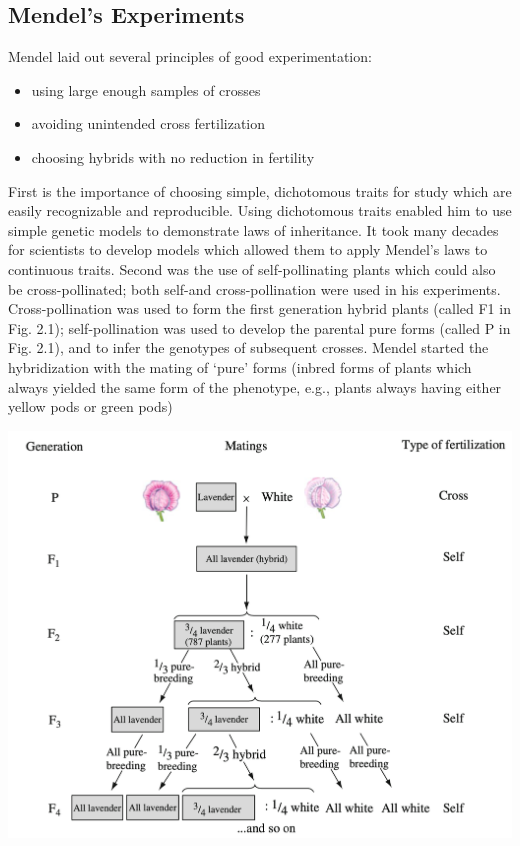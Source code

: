 \documentclass[a4paper,twoside,11pt]{article}
\begin{document}
\subsection{Mendel’s Experiments}
Mendel laid out several principles of good experimentation:
\begin{itemize}
    \item using large enough samples of crosses
    \item avoiding unintended cross fertilization
    \item choosing hybrids with no reduction in fertility
\end{itemize}
\textcolor{NavyBlue}{First is the importance of choosing simple, dichotomous traits for study which are easily recognizable and reproducible.} 
\newline
Using dichotomous traits enabled him to use simple genetic models to demonstrate laws of inheritance. It took many decades for scientists to develop models which allowed them to apply Mendel’s laws to continuous traits.
\newline
\newline
\textcolor{NavyBlue}{Second was the use of self-pollinating plants which could also be cross-pollinated; both self-and cross-pollination were used in his experiments.}
\newline
Cross-pollination was used to form the first generation hybrid plants (called F1 in Fig. 2.1); self-pollination was used to develop the parental pure forms (called P in Fig. 2.1), and to infer the genotypes of subsequent crosses. Mendel started the hybridization with the mating of ‘pure’ forms (inbred forms of plants which always yielded the same form of the phenotype, e.g., plants always having either yellow pods or green pods)
\begin{center}
\includegraphics[scale=0.5]{figure5.png}
\end{center}
\end{document}
